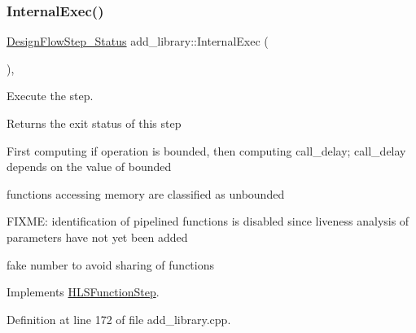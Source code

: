 \mbox{\label{classadd__library_a290796d0cb64ec96752255b3ae5cd3c2}} 
\subsubsection{\texorpdfstring{Internal\+Exec()}{InternalExec()}}
{\footnotesize\ttfamily \hyperlink{design__flow__step_8hpp_afb1f0d73069c26076b8d31dbc8ebecdf}{Design\+Flow\+Step\+\_\+\+Status} add\+\_\+library\+::\+Internal\+Exec (\begin{DoxyParamCaption}{ }\end{DoxyParamCaption})\hspace{0.3cm}{\ttfamily [override]}, {\ttfamily [virtual]}}



Execute the step. 

\begin{DoxyReturn}{Returns}
the exit status of this step 
\end{DoxyReturn}
First computing if operation is bounded, then computing call\+\_\+delay; call\+\_\+delay depends on the value of bounded

functions accessing memory are classified as unbounded

F\+I\+X\+ME\+: identification of pipelined functions is disabled since liveness analysis of parameters have not yet been added

fake number to avoid sharing of functions 

Implements \hyperlink{classHLSFunctionStep_a8db4c00d080655984d98143206fc9fa8}{H\+L\+S\+Function\+Step}.



Definition at line 172 of file add\+\_\+library.\+cpp.



